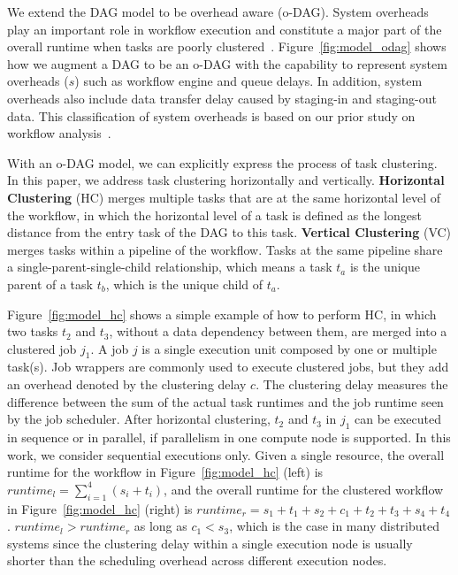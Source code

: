 \documentclass{IOS-Book-Article}
\begin{document}
We extend the DAG model to be overhead aware (o-DAG). System overheads play an important role in workflow execution and constitute a major part of the overall runtime when tasks are poorly clustered~\cite{Chen2011}. Figure~\ref{fig:model_odag} shows how we augment a DAG to be an o-DAG with the capability to represent system overheads ($s$) such as workflow engine and queue delays. In addition, system overheads also include data transfer delay caused by staging-in and staging-out data. This classification of system overheads is based on our prior study on workflow analysis~\cite{Chen2011}. 

With an o-DAG model, we can explicitly express the process of task clustering. In this paper, we address task clustering horizontally and vertically. \textbf{Horizontal Clustering} (HC) merges multiple tasks that are at the same horizontal level of the workflow, in which the horizontal level of a task is defined as the longest distance from the entry task of the DAG to this task. \textbf{Vertical Clustering} (VC) merges tasks within a pipeline of the workflow. Tasks at the same pipeline share a single-parent-single-child relationship, which means a task $t_a$ is the unique parent of a task $t_b$, which is the unique child of $t_a$. 

Figure~\ref{fig:model_hc} shows a simple example of how to perform HC, in which two tasks $t_2$ and $t_3$, without a data dependency between them, are merged into a clustered job $j_1$. A job $j$ is a single execution unit composed by one or multiple task(s). Job wrappers are commonly used to execute clustered jobs, but they add an overhead denoted by the clustering delay $c$. The clustering delay measures the difference between the sum of the actual task runtimes and the job runtime seen by the job scheduler. 
After horizontal clustering, $t_2$ and $t_3$ in $j_1$ can be executed in sequence or in parallel, if parallelism in one compute node is supported. In this work, we consider sequential executions only. Given a single resource, the overall runtime for the workflow in Figure~\ref{fig:model_hc} (left) is $runtime_l= \sum_{i=1}^{4}(s_i+t_i)$, and the overall runtime for the clustered workflow in Figure~\ref{fig:model_hc} (right) is $runtime_r=s_1+t_1+s_2+c_1+t_2+t_3+s_4+t_4$.  $runtime_l > runtime_r$ as long as $c_1 < s_3$, which is the case in many distributed systems since the clustering delay within a single execution node is usually shorter than the scheduling overhead across different execution nodes. 
\end{document}
